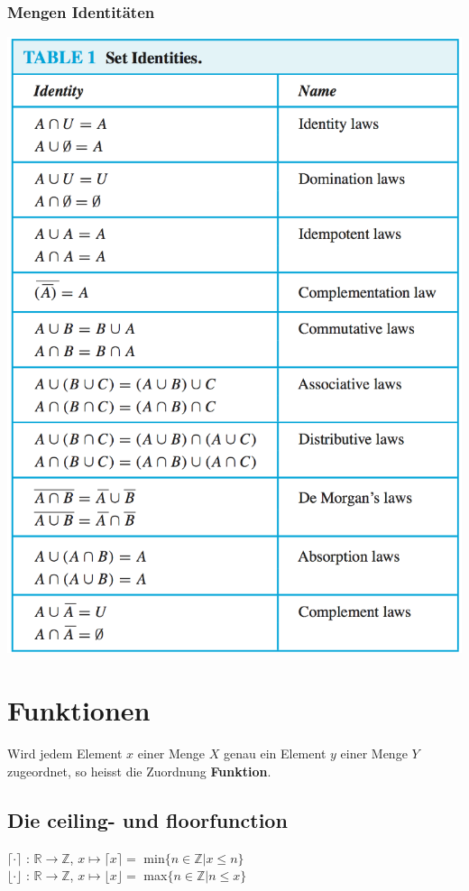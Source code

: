 \documentclass[12pt]{scrartcl}
\begin{document}
\subsubsection{Mengen Identitäten}
\includegraphics[width=15cm]{img/set_identities.png }




\section{Funktionen}
Wird jedem Element $x$ einer Menge $X$ genau ein Element $y$ einer Menge
$Y$ zugeordnet, so heisst die Zuordnung \textbf{Funktion}.


\subsection{Die ceiling- und floorfunction}
$\lceil \cdot \rceil$ :  $\mathbb{R} \rightarrow \mathbb{Z}$, $x \mapsto \lceil x \rceil =$ min$\{n \in \mathbb{Z} | x \leq n\}$\\
$\lfloor \cdot \rfloor$ :  $\mathbb{R} \rightarrow \mathbb{Z}$, $x \mapsto \lfloor x \rfloor =$ max$\{n \in \mathbb{Z} | n \leq x\}$\\
\end{document}
